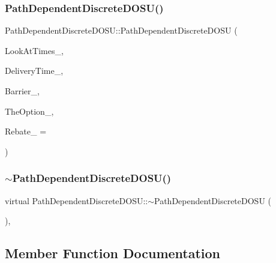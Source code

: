 \subsubsection{\texorpdfstring{Path\+Dependent\+Discrete\+D\+O\+S\+U()}{PathDependentDiscreteDOSU()}}
{\footnotesize\ttfamily Path\+Dependent\+Discrete\+D\+O\+S\+U\+::\+Path\+Dependent\+Discrete\+D\+O\+SU (\begin{DoxyParamCaption}\item[{const \hyperlink{classMJArray}{M\+J\+Array} \&}]{Look\+At\+Times\+\_\+,  }\item[{double}]{Delivery\+Time\+\_\+,  }\item[{double}]{Barrier\+\_\+,  }\item[{std\+::shared\+\_\+ptr$<$ \hyperlink{classMyOption_1_1Option}{My\+Option\+::\+Option} $>$}]{The\+Option\+\_\+,  }\item[{double}]{Rebate\+\_\+ = {} }\end{DoxyParamCaption})}

\hypertarget{classPathDependentDiscreteDOSU_ad692bd3c4251454cabc33aa632ef5f68}{}\label{classPathDependentDiscreteDOSU_ad692bd3c4251454cabc33aa632ef5f68} 
\subsubsection{\texorpdfstring{$\sim$\+Path\+Dependent\+Discrete\+D\+O\+S\+U()}{~PathDependentDiscreteDOSU()}}
{\footnotesize\ttfamily virtual Path\+Dependent\+Discrete\+D\+O\+S\+U\+::$\sim$\+Path\+Dependent\+Discrete\+D\+O\+SU (\begin{DoxyParamCaption}{ }\end{DoxyParamCaption})\hspace{0.3cm}{\ttfamily [inline]}, {\ttfamily [virtual]}}



\subsection{Member Function Documentation}
\hypertarget{classPathDependentDiscreteDOSU_a727544f701f7b950d52c36584c9cc006}{}\label{classPathDependentDiscreteDOSU_a727544f701f7b950d52c36584c9cc006} 
